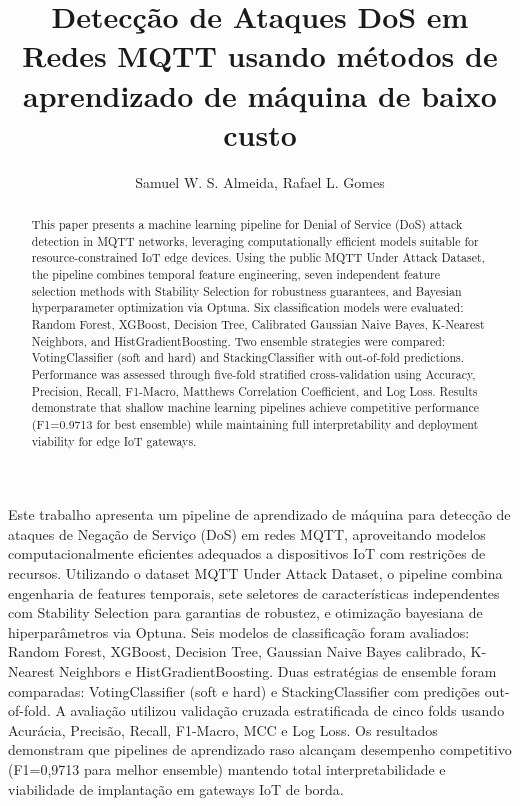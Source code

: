 \documentclass[12pt]{article}
\title{Detecção de Ataques DoS em Redes MQTT usando métodos de aprendizado de máquina de baixo custo}
\author{Samuel W. S. Almeida\inst{1}, Rafael L. Gomes\inst{1}}
\begin{document}
\maketitle

\begin{abstract}
This paper presents a machine learning pipeline for Denial of Service (DoS) attack detection in MQTT networks, leveraging computationally efficient models suitable for resource-constrained IoT edge devices. Using the public MQTT Under Attack Dataset, the pipeline combines temporal feature engineering, seven independent feature selection methods with Stability Selection for robustness guarantees, and Bayesian hyperparameter optimization via Optuna. Six classification models were evaluated: Random Forest, XGBoost, Decision Tree, Calibrated Gaussian Naive Bayes, K-Nearest Neighbors, and HistGradientBoosting. Two ensemble strategies were compared: VotingClassifier (soft and hard) and StackingClassifier with out-of-fold predictions. Performance was assessed through five-fold stratified cross-validation using Accuracy, Precision, Recall, F1-Macro, Matthews Correlation Coefficient, and Log Loss. Results demonstrate that shallow machine learning pipelines achieve competitive performance (F1=0.9713 for best ensemble) while maintaining full interpretability and deployment viability for edge IoT gateways.
\end{abstract}

\begin{resumo}
Este trabalho apresenta um pipeline de aprendizado de máquina para detecção de ataques de Negação de Serviço (DoS) em redes MQTT, aproveitando modelos computacionalmente eficientes adequados a dispositivos IoT com restrições de recursos. Utilizando o dataset MQTT Under Attack Dataset, o pipeline combina engenharia de features temporais, sete seletores de características independentes com Stability Selection para garantias de robustez, e otimização bayesiana de hiperparâmetros via Optuna. Seis modelos de classificação foram avaliados: Random Forest, XGBoost, Decision Tree, Gaussian Naive Bayes calibrado, K-Nearest Neighbors e HistGradientBoosting. Duas estratégias de ensemble foram comparadas: VotingClassifier (soft e hard) e StackingClassifier com predições out-of-fold. A avaliação utilizou validação cruzada estratificada de cinco folds usando Acurácia, Precisão, Recall, F1-Macro, MCC e Log Loss. Os resultados demonstram que pipelines de aprendizado raso alcançam desempenho competitivo (F1=0,9713 para melhor ensemble) mantendo total interpretabilidade e viabilidade de implantação em gateways IoT de borda.
\end{resumo}
\end{document}
